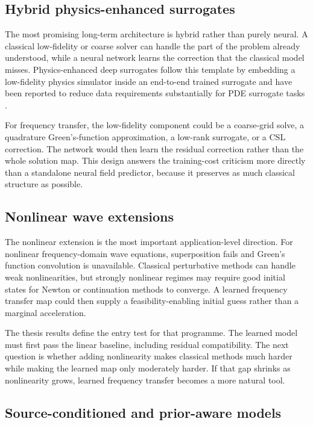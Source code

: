 \subsection{Hybrid physics-enhanced surrogates}
\label{subsec:discussion-future-peds}

The most promising long-term architecture is hybrid rather than purely
neural. A classical low-fidelity or coarse solver can handle the part of the
problem already understood, while a neural network learns the correction that
the classical model misses. Physics-enhanced deep surrogates follow this
template by embedding a low-fidelity physics simulator inside an end-to-end
trained surrogate and have been reported to reduce data requirements
substantially for PDE surrogate tasks \cite{PestourieEtAl2023PEDS}.

For frequency transfer, the low-fidelity component could be a coarse-grid
solve, a quadrature Green's-function approximation, a low-rank surrogate, or a
CSL correction. The network would then learn the residual correction rather
than the whole solution map. This design answers the training-cost criticism
more directly than a standalone neural field predictor, because it preserves
as much classical structure as possible.

\subsection{Nonlinear wave extensions}
\label{subsec:discussion-future-nonlinear}

The nonlinear extension is the most important application-level direction.
For nonlinear frequency-domain wave equations, superposition fails and Green's
function convolution is unavailable. Classical perturbative methods can handle
weak nonlinearities, but strongly nonlinear regimes may require good initial
states for Newton or continuation methods to converge. A learned frequency
transfer map could then supply a feasibility-enabling initial guess rather
than a marginal acceleration.

The thesis results define the entry test for that programme. The learned model
must first pass the linear baseline, including residual compatibility. The
next question is whether adding nonlinearity makes classical methods much
harder while making the learned map only moderately harder. If that gap
shrinks as nonlinearity grows, learned frequency transfer becomes a more
natural tool.

\subsection{Source-conditioned and prior-aware models}
\label{subsec:discussion-future-source}

